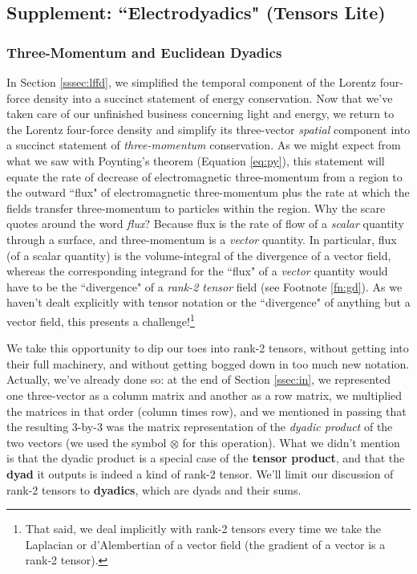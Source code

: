 \documentclass[12pt]{article}
\begin{document}
\subsection[Supplement: "Electrodyadics" (Tensors Lite)]{Supplement: ``Electrodyadics" (Tensors Lite)}\label{ssec:dy}

\subsubsection{Three-Momentum and Euclidean Dyadics}\label{sssec:emm}

In Section \ref{sssec:lffd}, we simplified the temporal component of the Lorentz four-force density into a succinct statement of energy conservation. Now that we've taken care of our unfinished business concerning light and energy, we return to the Lorentz four-force density and simplify its three-vector \emph{spatial} component into a succinct statement of \emph{three-momentum} conservation. As we might expect from what we saw with Poynting's theorem (Equation \ref{eq:py}), this statement will equate the rate of decrease of electromagnetic three-momentum from a region to the outward ``flux" of electromagnetic three-momentum plus the rate at which the fields transfer three-momentum to particles within the region. Why the scare quotes around the word \emph{flux}? Because flux is the rate of flow of a \emph{scalar} quantity through a surface, and three-momentum is a \emph{vector} quantity. In particular, flux (of a scalar quantity) is the volume-integral of the divergence of a vector field, whereas the corresponding integrand for the ``flux" of a \emph{vector} quantity would have to be the ``divergence" of a \emph{rank-2 tensor} field (see Footnote \ref{fn:gd}). As we haven't dealt explicitly with tensor notation or the ``divergence" of anything but a vector field, this presents a challenge!\footnote{That said, we deal implicitly with rank-2 tensors every time we take the Laplacian or d'Alembertian of a vector field (the gradient of a vector is a rank-2 tensor).}

We take this opportunity to dip our toes into rank-2 tensors, without getting into their full machinery, and without getting bogged down in too much new notation. Actually, we've already done so: at the end of Section \ref{ssec:in}, we represented one three-vector as a column matrix and another as a row matrix, we multiplied the matrices in that order (column times row), and we mentioned in passing that the resulting 3-by-3 was the matrix representation of the \emph{dyadic product} of the two vectors (we used the symbol $\otimes$ for this operation). What we didn't mention is that the dyadic product is a special case of the \textbf{tensor product}, and that the \textbf{dyad} it outputs is indeed a kind of rank-2 tensor. We'll limit our discussion of rank-2 tensors to \textbf{dyadics}, which are dyads and their sums.
\end{document}
